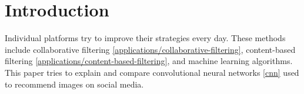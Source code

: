 \section{Introduction} \label{introduction}

Individual platforms try to improve their strategies every day. These methods include collaborative filtering \ref{applications/collaborative-filtering}, content-based filtering \ref{applications/content-based-filtering}, and machine learning algorithms.\cite{10142790} This paper tries to explain and compare convolutional neural networks \ref{cnn} used to recommend images on social media.

